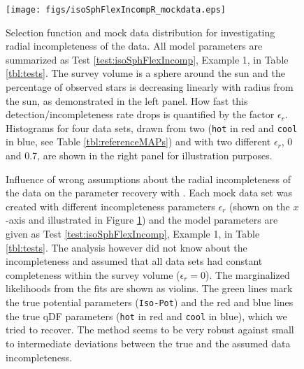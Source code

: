 
\begin{figure}
\texttt{[image: figs/isoSphFlexIncompR\_mockdata.eps]}
\caption{Selection function and mock data distribution for investigating radial incompleteness of the data. All model parameters are summarized as Test \ref{test:isoSphFlexIncomp}, Example 1, in Table \ref{tbl:tests}. The survey volume is a sphere around the sun and the percentage of observed stars is decreasing linearly with radius from the sun, as demonstrated in the left panel. How fast this detection/incompleteness rate drops is quantified by the factor $\epsilon_r$. Histograms for four data sets, drawn from two \MAPs{} (\texttt{hot} in red and \texttt{cool} in blue, see Table \ref{tbl:referenceMAPs}) and with two different $\epsilon_r$, 0 and 0.7, are shown in the right panel for illustration purposes. } 
\label{fig:isoSphFlexIncompR_mockdata}
\end{figure}


\begin{figure}
\centering
{}
\caption{Influence of wrong assumptions about the radial incompleteness of the data on the parameter recovery with \RM{}. Each mock data set was created with different incompleteness parameters $\epsilon_r$ (shown on the $x$-axis and illustrated in Figure \ref{fig:isoSphFlexIncompR_mockdata}) and the model parameters are given as Test \ref{test:isoSphFlexIncomp}, Example 1, in Table \ref{tbl:tests}. The analysis however did not know about the incompleteness and assumed that all data sets had constant completeness within the survey volume ($\epsilon_r = 0$). The marginalized likelihoods from the fits are shown as violins. The green lines mark the true potential parameters (\texttt{Iso-Pot}) and the red and blue lines the true qDF parameters (\texttt{hot} \MAP in red and \texttt{cool} \MAP in blue), which we tried to recover. The \RM{} method seems to be very robust against small to intermediate deviations between the true and the assumed data incompleteness. } 
\label{fig:isoSphFlexIncompR_violins}
\end{figure}

